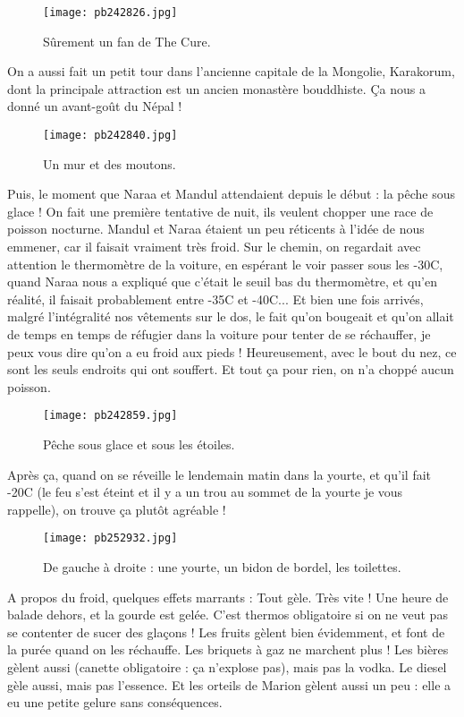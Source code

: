 \documentclass{book}
\begin{document}
\begin{figure}[h]
\centering
\texttt{[image: pb242826.jpg]}
\caption*{ Sûrement un fan de The Cure.}
\end{figure}

On a aussi fait un petit tour dans l'ancienne capitale de la Mongolie, Karakorum, dont la principale attraction est un ancien monastère bouddhiste. Ça nous a donné un avant-goût du Népal !


\begin{figure}[h]
\centering
\texttt{[image: pb242840.jpg]}
\caption*{ Un mur et des moutons.}
\end{figure}

Puis, le moment que Naraa et Mandul attendaient depuis le début : la pêche sous glace ! On fait une première tentative de nuit, ils veulent chopper une race de poisson nocturne. Mandul et Naraa étaient un peu réticents à l'idée de nous emmener, car il faisait vraiment très froid. Sur le chemin, on regardait avec attention le thermomètre de la voiture, en espérant le voir passer sous les -30\textdegree C, quand Naraa nous a expliqué que c'était le seuil bas du thermomètre, et qu'en réalité, il faisait probablement entre -35\textdegree C et -40\textdegree C... Et bien une fois arrivés, malgré l'intégralité nos vêtements sur le dos, le fait qu'on bougeait et qu'on allait de temps en temps de réfugier dans la voiture pour tenter de se réchauffer, je peux vous dire qu'on a eu froid aux pieds ! Heureusement, avec le bout du nez, ce sont les seuls endroits qui ont souffert. Et tout ça pour rien, on n'a choppé aucun poisson.


\begin{figure}[h]
\centering
\texttt{[image: pb242859.jpg]}
\caption*{ Pêche sous glace et sous les étoiles.}
\end{figure}

Après ça, quand on se réveille le lendemain matin dans la yourte, et qu'il fait -20\textdegree C (le feu s'est éteint et il y a un trou au sommet de la yourte je vous rappelle), on trouve ça plutôt agréable !


\begin{figure}[h]
\centering
\texttt{[image: pb252932.jpg]}
\caption*{ De gauche à droite : une yourte, un bidon de bordel, les toilettes.}
\end{figure}

A propos du froid, quelques effets marrants : Tout gèle. Très vite ! Une heure de balade dehors, et la gourde est gelée. C'est thermos obligatoire si on ne veut pas se contenter de sucer des glaçons ! Les fruits gèlent bien évidemment, et font de la purée quand on les réchauffe. Les briquets à gaz ne marchent plus ! Les bières gèlent aussi (canette obligatoire : ça n'explose pas), mais pas la vodka. Le diesel gèle aussi, mais pas l'essence. Et les orteils de Marion gèlent aussi un peu : elle a eu une petite gelure sans conséquences.
\end{document}
